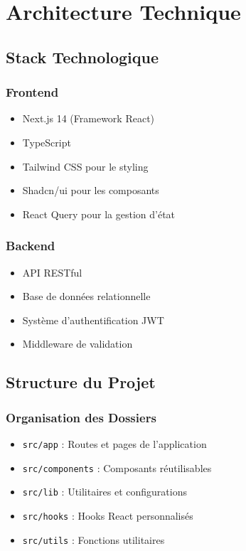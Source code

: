 \documentclass[12pt,a4paper]{report}
\begin{document}
\chapter{Architecture Technique}
\section{Stack Technologique}
\subsection{Frontend}
\begin{itemize}
    \item Next.js 14 (Framework React)
    \item TypeScript
    \item Tailwind CSS pour le styling
    \item Shadcn/ui pour les composants
    \item React Query pour la gestion d'état
\end{itemize}

\subsection{Backend}
\begin{itemize}
    \item API RESTful
    \item Base de données relationnelle
    \item Système d'authentification JWT
    \item Middleware de validation
\end{itemize}

\section{Structure du Projet}
\subsection{Organisation des Dossiers}
\begin{itemize}
    \item \texttt{src/app} : Routes et pages de l'application
    \item \texttt{src/components} : Composants réutilisables
    \item \texttt{src/lib} : Utilitaires et configurations
    \item \texttt{src/hooks} : Hooks React personnalisés
    \item \texttt{src/utils} : Fonctions utilitaires
\end{itemize}
\end{document}
